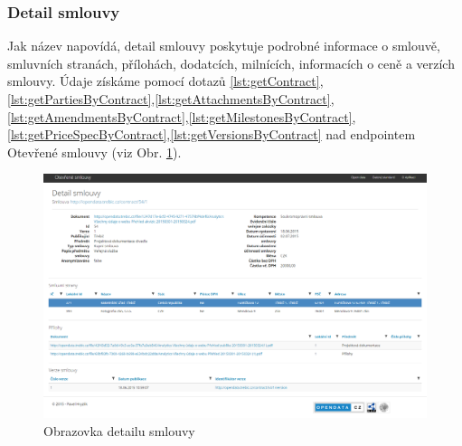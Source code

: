 





\newpage

\subsubsection*{Detail smlouvy}

Jak název napovídá, detail smlouvy poskytuje podrobné informace o smlouvě, smluvních stranách, přílohách, dodatcích, milnících, informacích o ceně a verzích smlouvy. Údaje získáme pomocí dotazů \ref{lst:getContract},\ref{lst:getPartiesByContract},\ref{lst:getAttachmentsByContract},\ref{lst:getAmendmentsByContract},\ref{lst:getMilestonesByContract},\ref{lst:getPriceSpecByContract},\ref{lst:getVersionsByContract} nad endpointem Otevřené smlouvy (viz Obr. \ref{obr:contractDetail}).\\

\begin{figure}[H]
\centerline{\includegraphics[width=\textwidth]{img/webContractDetail.eps}}
\caption{Obrazovka detailu smlouvy}
\label{obr:contractDetail}
\end{figure}



